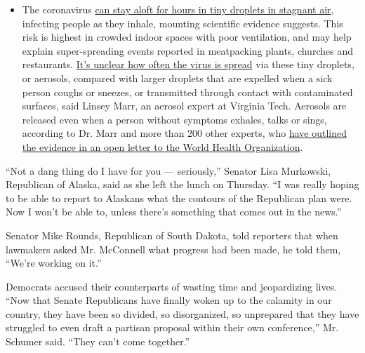 \begin{itemize}
  \begin{itemize}
  \tightlist
  \item
    The coronavirus
    \href{https://www.nytimes3xbfgragh.onion/2020/07/04/health/239-experts-with-one-big-claim-the-coronavirus-is-airborne.html?action=click\&pgtype=Article\&state=default\&region=MAIN_CONTENT_3\&context=storylines_faq}{can
    stay aloft for hours in tiny droplets in stagnant air}, infecting
    people as they inhale, mounting scientific evidence suggests. This
    risk is highest in crowded indoor spaces with poor ventilation, and
    may help explain super-spreading events reported in meatpacking
    plants, churches and restaurants.
    \href{https://www.nytimes3xbfgragh.onion/2020/07/06/health/coronavirus-airborne-aerosols.html?action=click\&pgtype=Article\&state=default\&region=MAIN_CONTENT_3\&context=storylines_faq}{It's
    unclear how often the virus is spread} via these tiny droplets, or
    aerosols, compared with larger droplets that are expelled when a
    sick person coughs or sneezes, or transmitted through contact with
    contaminated surfaces, said Linsey Marr, an aerosol expert at
    Virginia Tech. Aerosols are released even when a person without
    symptoms exhales, talks or sings, according to Dr. Marr and more
    than 200 other experts, who
    \href{https://academic.oup.com/cid/article/doi/10.1093/cid/ciaa939/5867798}{have
    outlined the evidence in an open letter to the World Health
    Organization}.
  \end{itemize}
\end{itemize}

``Not a dang thing do I have for you --- seriously,'' Senator Lisa
Murkowski, Republican of Alaska, said as she left the lunch on Thursday.
``I was really hoping to be able to report to Alaskans what the contours
of the Republican plan were. Now I won't be able to, unless there's
something that comes out in the news.''

Senator Mike Rounds, Republican of South Dakota, told reporters that
when lawmakers asked Mr. McConnell what progress had been made, he told
them, ``We're working on it.''

Democrats accused their counterparts of wasting time and jeopardizing
lives. ``Now that Senate Republicans have finally woken up to the
calamity in our country, they have been so divided, so disorganized, so
unprepared that they have struggled to even draft a partisan proposal
within their own conference,'' Mr. Schumer said. ``They can't come
together.''

